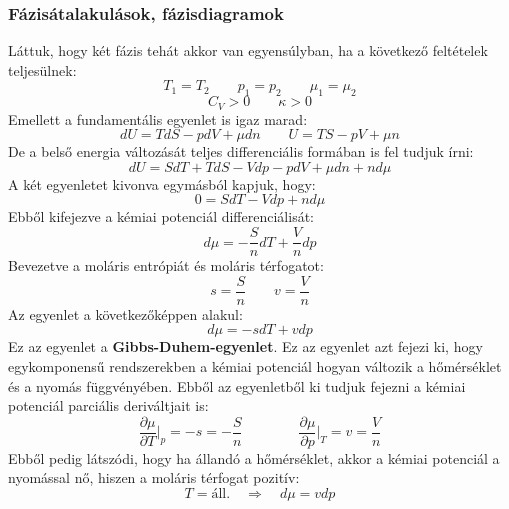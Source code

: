 \documentclass[../main.tex]{subfiles}
\begin{document}
\subsubsection{Fázisátalakulások, fázisdiagramok}
Láttuk, hogy két fázis tehát akkor van egyensúlyban, ha a következő feltételek teljesülnek:
\begin{equation}
    T_1 = T_2 \qquad p_1 = p_2 \qquad \mu_1 = \mu_2
\end{equation}
\begin{equation}
   C_{V} > 0 \qquad \kappa > 0
\end{equation}
Emellett a fundamentális egyenlet is igaz marad:
\begin{equation}
    dU = T dS - p dV + \mu dn \qquad U = TS - pV + \mu n
\end{equation}
De a belső energia változását teljes differenciális formában is fel tudjuk írni:
\begin{equation}
    dU = SdT + TdS - Vdp - pdV + \mu dn + n d\mu
\end{equation}
A két egyenletet kivonva egymásból kapjuk, hogy:
\begin{equation}
    0 = SdT - Vdp + n d\mu
\end{equation}
Ebből kifejezve a kémiai potenciál differenciálisát:
\begin{equation}
    d\mu = - \frac{S}{n} dT + \frac{V}{n} dp
\end{equation}
Bevezetve a moláris entrópiát és moláris térfogatot:
\begin{equation}
    s = \frac{S}{n} \qquad v = \frac{V}{n}
\end{equation}
Az egyenlet a következőképpen alakul:
\begin{equation}
    d\mu = - s dT + v dp
\end{equation}
Ez az egyenlet a \textbf{Gibbs-Duhem-egyenlet}. Ez az egyenlet azt fejezi ki, hogy egykomponensű rendszerekben a kémiai potenciál hogyan változik a hőmérséklet és
a nyomás függvényében. Ebből az egyenletből ki tudjuk fejezni a kémiai potenciál parciális deriváltjait is:
\begin{equation}
    \frac{\partial \mu}{\partial T}\bigg|_{p} = - s = - \frac{S}{n} \qquad \qquad \frac{\partial \mu}{\partial p}\bigg|_{T} = v = \frac{V}{n}
\end{equation}
Ebből pedig látszódi, hogy ha állandó a hőmérséklet, akkor a kémiai potenciál a nyomással nő, hiszen a moláris térfogat pozitív:
\begin{equation}
    T = \text{áll.} \quad \Rightarrow \quad d\mu = vdp
\end{equation}
\end{document}
